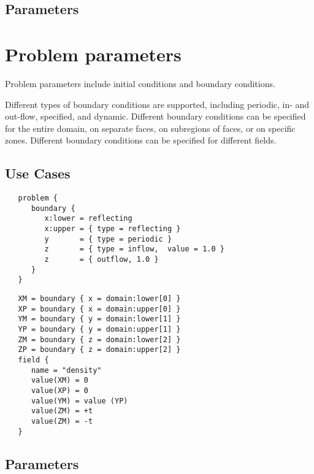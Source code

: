 \documentclass{book}
\begin{document}
\subsection{Parameters}

\section{Problem parameters} \label{s:problem}

Problem parameters include initial conditions and boundary conditions.

Different types of boundary conditions are supported, including
periodic, in- and out-flow, specified, and dynamic.  Different
boundary conditions can be specified for the entire domain, on
separate faces, on subregions of faces, or on specific zones.
Different boundary conditions can be specified for different fields.
\subsection{Use Cases}

\begin{verbatim}
   problem {
      boundary {
         x:lower = reflecting
         x:upper = { type = reflecting }
         y       = { type = periodic }
         z       = { type = inflow,  value = 1.0 }
         z       = { outflow, 1.0 }
      }
   }
\end{verbatim}

\begin{verbatim}
   XM = boundary { x = domain:lower[0] }
   XP = boundary { x = domain:upper[0] }
   YM = boundary { y = domain:lower[1] }
   YP = boundary { y = domain:upper[1] }
   ZM = boundary { z = domain:lower[2] }
   ZP = boundary { z = domain:upper[2] }
   field {
      name = "density"
      value(XM) = 0
      value(XP) = 0
      value(YM) = value (YP)
      value(ZM) = +t
      value(ZM) = -t
   }
\end{verbatim}

\subsection{Parameters}
\end{document}
